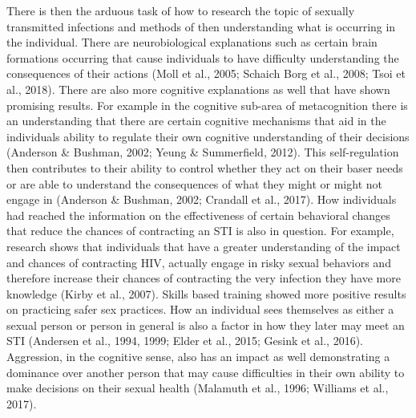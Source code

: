 \documentclass[
  english,
  donotrepeattitle,doc, 12pt, a4paper,floatsintext]{apa7}
\begin{document}
There is then the arduous task of how to research the topic of sexually transmitted infections and methods of then understanding what is occurring in the individual. There are neurobiological explanations such as certain brain formations occurring that cause individuals to have difficulty understanding the consequences of their actions (Moll et al., 2005; Schaich Borg et al., 2008; Tsoi et al., 2018). There are also more cognitive explanations as well that have shown promising results. For example in the cognitive sub-area of metacognition there is an understanding that there are certain cognitive mechanisms that aid in the individuals ability to regulate their own cognitive understanding of their decisions (Anderson \& Bushman, 2002; Yeung \& Summerfield, 2012). This self-regulation then contributes to their ability to control whether they act on their baser needs or are able to understand the consequences of what they might or might not engage in (Anderson \& Bushman, 2002; Crandall et al., 2017). How individuals had reached the information on the effectiveness of certain behavioral changes that reduce the chances of contracting an STI is also in question. For example, research shows that individuals that have a greater understanding of the impact and chances of contracting HIV, actually engage in risky sexual behaviors and therefore increase their chances of contracting the very infection they have more knowledge (Kirby et al., 2007). Skills based training showed more positive results on practicing safer sex practices. How an individual sees themselves as either a sexual person or person in general is also a factor in how they later may meet an STI (Andersen et al., 1994, 1999; Elder et al., 2015; Gesink et al., 2016). Aggression, in the cognitive sense, also has an impact as well demonstrating a dominance over another person that may cause difficulties in their own ability to make decisions on their sexual health (Malamuth et al., 1996; Williams et al., 2017).
\end{document}
